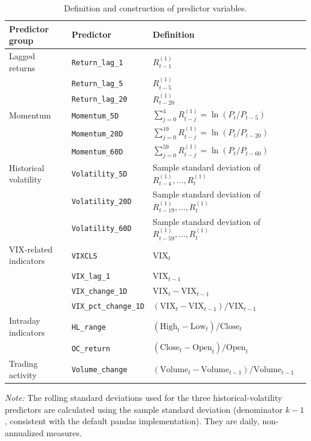 \documentclass[runningheads,orivec]{llncs}
\begin{document}
\begin{table}[htbp]
\centering
\caption{Definition and construction of predictor variables.}\label{tab:predictor_definitions}
\setlength{\tabcolsep}{4pt}
\begin{tabular}{lll}
\hline
Predictor group & Predictor & Definition \\
\hline
Lagged returns & \texttt{Return\_lag\_1} & $R_{t-1}^{(1)}$ \\
& \texttt{Return\_lag\_5} & $R_{t-5}^{(1)}$ \\
& \texttt{Return\_lag\_20} & $R_{t-20}^{(1)}$ \\
\hline
Momentum & \texttt{Momentum\_5D} & $\sum_{j=0}^{4} R_{t-j}^{(1)} = \ln(P_t/P_{t-5})$ \\
& \texttt{Momentum\_20D} & $\sum_{j=0}^{19} R_{t-j}^{(1)} = \ln(P_t/P_{t-20})$ \\
& \texttt{Momentum\_60D} & $\sum_{j=0}^{59} R_{t-j}^{(1)} = \ln(P_t/P_{t-60})$ \\
\hline
Historical volatility & \texttt{Volatility\_5D} & Sample standard deviation of $R_{t-4}^{(1)},\dots,R_t^{(1)}$ \\
& \texttt{Volatility\_20D} & Sample standard deviation of $R_{t-19}^{(1)},\dots,R_t^{(1)}$ \\
& \texttt{Volatility\_60D} & Sample standard deviation of $R_{t-59}^{(1)},\dots,R_t^{(1)}$ \\
\hline
VIX-related indicators & \texttt{VIXCLS} & $\text{VIX}_t$ \\
& \texttt{VIX\_lag\_1} & $\text{VIX}_{t-1}$ \\
& \texttt{VIX\_change\_1D} & $\text{VIX}_t - \text{VIX}_{t-1}$ \\
& \texttt{VIX\_pct\_change\_1D} & $(\text{VIX}_t - \text{VIX}_{t-1})/\text{VIX}_{t-1}$ \\
\hline
Intraday indicators & \texttt{HL\_range} & $(\text{High}_t - \text{Low}_t)/\text{Close}_t$ \\
& \texttt{OC\_return} & $(\text{Close}_t - \text{Open}_t)/\text{Open}_t$ \\
\hline
Trading activity & \texttt{Volume\_change} & $(\text{Volume}_t - \text{Volume}_{t-1})/\text{Volume}_{t-1}$ \\
\hline
\end{tabular}
\par\vspace{4pt}\parbox{\linewidth}{\scriptsize\textit{Note:} The rolling standard deviations used for the three historical-volatility predictors are calculated using the sample standard deviation (denominator $k-1$, consistent with the default pandas implementation). They are daily, non-annualized measures.}
\end{table}
\end{document}
